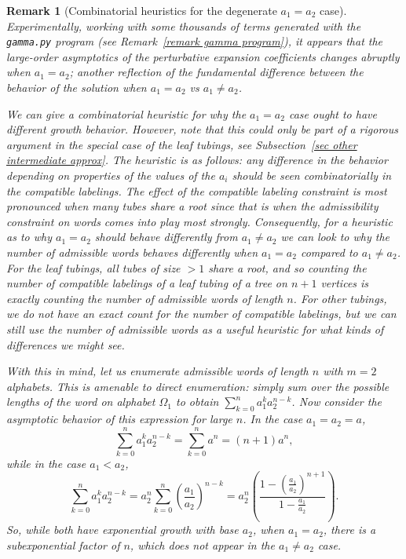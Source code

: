 \documentclass[oneside]{amsart}
\newtheorem{remark}[thm]{Remark}
\theoremstyle{definition}
\begin{document}
\begin{remark}[Combinatorial heuristics for the degenerate $a_1=a_2$ case]
Experimentally, working with some thousands of terms
generated with the \texttt{gamma.py} program (see Remark~\ref{remark gamma program}), it appears that the large-order asymptotics of the perturbative expansion coefficients changes abruptly when $a_1=a_2$; another reflection of the fundamental difference between the behavior of the solution when $a_1=a_2$ vs $a_1 \neq a_2$. 

We can give a combinatorial heuristic for why the $a_1=a_2$ case ought to have different growth behavior. However, note that this could only be part of a rigorous argument in the special case of the leaf tubings, see Subsection~\ref{sec other intermediate approx}.  The heuristic is as follows: any difference in the behavior depending on properties of the values of the $a_i$ should be seen combinatorially in the compatible labelings. The effect of the compatible labeling constraint is most pronounced when many tubes share a root since that is when the admissibility constraint on words comes into play most strongly.  Consequently, for a heuristic as to why $a_1=a_2$ should behave differently from $a_1\neq a_2$ we can look to why the number of admissible words behaves differently when $a_1=a_2$ compared to $a_1\neq a_2$.  For the leaf tubings, all tubes of size $>1$ share a root, and so counting the number of compatible labelings of a leaf tubing of a tree on $n+1$ vertices is exactly counting the number of admissible words of length $n$.  For other tubings, we do not have an exact count for the number of compatible labelings, but we can still use the number of admissible words as a useful heuristic for what kinds of differences we might see.

With this in mind, let us enumerate admissible words of length $n$ with $m=2$ alphabets.  This is amenable to direct enumeration: simply sum over the possible lengths of the word on alphabet $\Omega_1$ to obtain $\sum_{k=0}^{n}a_1^k a_2^{n-k}$.  Now consider the asymptotic behavior of this expression for large $n$. In the case $a_1=a_2 =a$,
\[
\sum_{k=0}^{n}a_1^k a_2^{n-k} = \sum_{k=0}^{n}a^{n} = (n+1)a^{n}, 
\]
while in the case $a_1<a_2$, 
\[
\sum_{k=0}^{n}a_1^{k}a_2^{n-k}  = a_2^{n}\sum_{k=0}^{n}\left(\frac{a_1}{a_2}\right)^{n-k} = a_2^{n}\left(\frac{1-\left(\frac{a_1}{a_2}\right)^{n+1}}{1-\frac{a_1}{a_2}}\right).
\]
So, while both have exponential growth with base $a_2$, when $a_1=a_2$, there is a subexponential factor of $n$, which does not appear in the $a_1\neq a_2$ case.
\end{remark}
\end{document}
